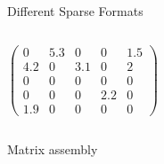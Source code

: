 \documentclass[aspectratio=169,xcolor=dvipsnames]{beamer}
\begin{document}
\begin{frame}{Different Sparse Formats}
\begin{columns}[c]
        $ \left( \begin{array}{rrrrr} 
0 & 5.3 & 0 & 0 & 1.5\\ 
4.2 & 0& 3.1 & 0 & 2\\ 
0 & 0 & 0 & 0 & 0 \\
0 & 0 & 0 & 2.2 & 0 \\
1.9 & 0 & 0 & 0 & 0
\end{array} \right) $

    \end{columns}
\end{frame}

\begin{frame}{Matrix assembly}

\end{frame}
\end{document}
